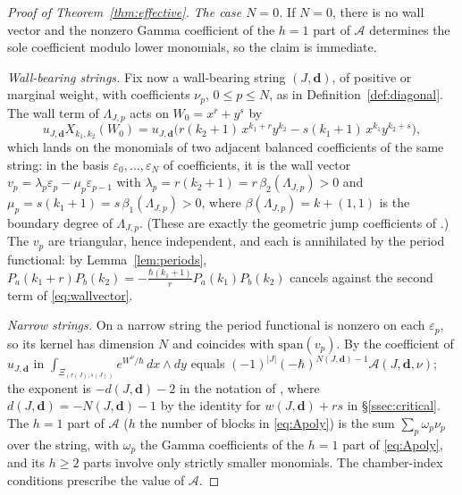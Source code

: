 \documentclass[11pt]{amsart}
\theoremstyle{definition}
\theoremstyle{remark}
\newcommand{\Ascr}{\mathcal{A}}
\begin{document}
\begin{proof}[Proof of Theorem~\ref{thm:effective}]
\emph{The case $N=0$.}
If $N=0$, there is no wall vector and the nonzero Gamma coefficient of
the $h=1$ part of $\Ascr$ determines the sole coefficient modulo lower monomials, so the claim is
immediate.

\emph{Wall-bearing strings.}
Fix now a wall-bearing string $(J,\mathbf d)$, of positive or
marginal weight, with coefficients $\nu_{p}$, $0\le p\le N$, as in
Definition~\ref{def:diagonal}. The wall term of
$\Lambda_{J,p}$ acts on $W_{0}=x^{r}+y^{s}$ by
\begin{equation}
\label{eq:wallvector}
u_{J,\mathbf d}X_{k_{1},k_{2}}(W_{0})
=u_{J,\mathbf d}\bigl(r(k_{2}{+}1)\,x^{k_{1}+r}y^{k_{2}}
-s(k_{1}{+}1)\,x^{k_{1}}y^{k_{2}+s}\bigr),
\end{equation}
which lands on the monomials of two adjacent balanced coefficients of the same
string: in the basis
$\varepsilon_{0},\dots,\varepsilon_{N}$ of coefficients, it is the wall vector
$v_{p}=\lambda_{p}\varepsilon_{p}-\mu_{p}\varepsilon_{p-1}$ with
$\lambda_{p}=r(k_{2}{+}1)=r\,\beta_{2}(\Lambda_{J,p})>0$ and
$\mu_{p}=s(k_{1}{+}1)=s\,\beta_{1}(\Lambda_{J,p})>0$, where
$\beta(\Lambda_{J,p})=k+(1,1)$ is the boundary degree of $\Lambda_{J,p}$.
(These are exactly the geometric jump coefficients of \cite[(5.52)--(5.54)]{GKT}.) The $v_{p}$ are triangular, hence
independent, and each is annihilated by the period functional: by
Lemma~\ref{lem:periods}, $P_{a}(k_{1}{+}r)P_{b}(k_{2})
=-\tfrac{\hbar(k_{1}+1)}{r}P_{a}(k_{1})P_{b}(k_{2})$ cancels against the second
term of \eqref{eq:wallvector}.

\emph{Narrow strings.}
On a narrow string the period functional is nonzero on each $\varepsilon_{p}$, so its kernel has
dimension $N$ and coincides with $\mathrm{span}(v_{p})$. By
\cite[Thm.~4.9]{GKT} the coefficient of $u_{J,\mathbf d}$ in
$\int_{\Xi_{(r(J),s(J))}}e^{W^{\nu}/\hbar}\,dx\wedge dy$ equals
$(-1)^{|J|}(-\hbar)^{N(J,\mathbf d)-1}\Ascr(J,\mathbf d,\nu)$; the
exponent is $-d(J,\mathbf d)-2$ in the notation of \cite[Def.~4.8]{GKT},
where $d(J,\mathbf d)=-N(J,\mathbf d)-1$ by the identity for
$w(J,\mathbf d)+rs$ in \S\ref{ssec:critical}.  The $h=1$ part of $\Ascr$
($h$ the number of blocks in \eqref{eq:Apoly}) is
the sum $\sum_{p}\omega_{p}\nu_{p}$ over the string, with
$\omega_p$ the Gamma coefficients of the $h=1$ part of \eqref{eq:Apoly}, and its
$h\ge2$ parts involve only strictly smaller monomials. The chamber-index
conditions \cite[Def.~3.47]{GKT} prescribe the value of $\Ascr$.


\end{proof}
\end{document}
